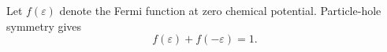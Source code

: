 \documentclass{article}
\begin{document}
Let $f(\varepsilon)$ denote the Fermi function at zero chemical potential. Particle-hole symmetry gives
\begin{equation}
f(\varepsilon) + f(-\varepsilon) = 1 .
\label{eq:ph}
\end{equation}
\end{document}
